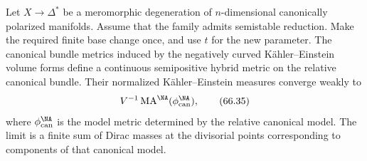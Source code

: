 \begin{theorem}\label{thm:hybrid-ke}
Let $X\to\Delta^*$ be a meromorphic degeneration of $n$-dimensional canonically polarized manifolds. Assume that the family admits semistable reduction. Make the required finite base change once, and use $t$ for the new parameter. The canonical bundle metrics induced by the negatively curved K\"ahler--Einstein volume forms define a continuous semipositive hybrid metric on the relative canonical bundle. Their normalized K\"ahler--Einstein measures converge weakly to
\[
              V^{-1}\operatorname{MA}^{\NA}
                     (\phi_{\mathrm{can}}^{\NA}),
\tag{66.35}\label{eq:hybrid-ke-limit}
\]
where $\phi_{\mathrm{can}}^{\NA}$ is the model metric determined by the relative canonical model. The limit is a finite sum of Dirac masses at the divisorial points corresponding to components of that canonical model.
\end{theorem}

